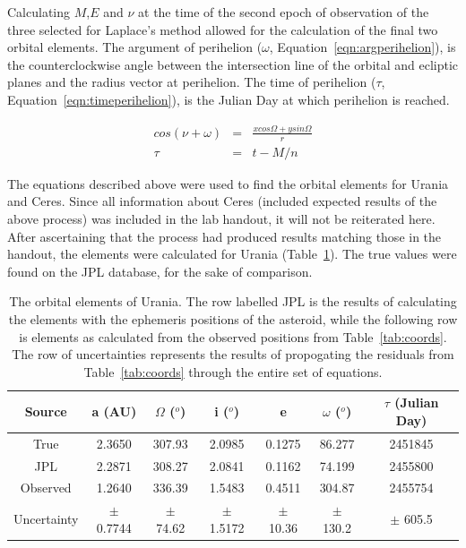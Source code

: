 \documentclass[a4paper,12pt]{article}
\begin{document}
Calculating $M$,$E$ and $\nu$ at the time of the second epoch of observation of the three selected for Laplace's method allowed for the calculation of the final two orbital elements. The argument of perihelion ($\omega$, Equation~\ref{eqn:argperihelion}), is the counterclockwise angle between the intersection line of the orbital and ecliptic planes and the radius vector at perihelion. The time of perihelion ($\tau$, Equation~\ref{eqn:timeperihelion}), is the Julian Day at which perihelion is reached.

\begin{eqnarray}
\label{eqn:argperihelion}
cos(\nu+\omega) &=& \frac{xcos\Omega + ysin\Omega}{r}\\
\label{eqn:timeperihelion}
\tau &=& t - M/n
\end{eqnarray}

The equations described above were used to find the orbital elements for Urania and Ceres. Since all information about Ceres (included expected results of the above process) was included in the lab handout, it will not be reiterated here. After ascertaining that the process had produced results matching those in the handout, the elements were calculated for Urania (Table~\ref{tab:elements}). The true values were found on the JPL database, for the sake of comparison.

\begin{table}[!htbp]
	\centering
	\begin{tabular}{|c||c||c||c||c||c||c|}
	\hline
	Source & a (AU) & $\Omega$ ($^o$) & i ($^o$) & e & $\omega$ ($^o$) & $\tau$ (Julian Day)\\
	\hline
  \hline
	True & 2.3650 & 307.93 & 2.0985 & 0.1275 & 86.277 & 2451845\\
	\hline
	JPL & 2.2871 & 308.27 & 2.0841 & 0.1162 & 74.199 & 2455800\\
	\hline
	Observed & 1.2640 & 336.39 & 1.5483 & 0.4511 & 304.87 & 2455754 \\
  \hline
  Uncertainty & $\pm$ 0.7744 & $\pm$ 74.62 & $\pm$ 1.5172 & $\pm$ 10.36 & $\pm$ 130.2 & $\pm$ 605.5\\
  \hline
	\end{tabular}
	\caption{The orbital elements of Urania. The row labelled JPL is the results of calculating the elements with the ephemeris positions of the asteroid, while the following row is elements as calculated from the observed positions from Table~\ref{tab:coords}. The row of uncertainties represents the results of propogating the residuals from Table~\ref{tab:coords} through the entire set of equations.}
	\label{tab:elements}
\end{table}
\end{document}
